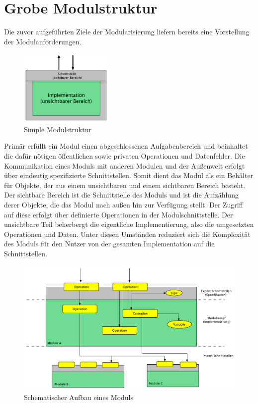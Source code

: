   \section{Grobe Modulstruktur}
      Die zuvor aufgeführten Ziele der Modularisierung liefern bereits eine Vorstellung der Modulanforderungen.
        \begin{figure}[h!] 
        \centering
        \includegraphics[width=0.4\textwidth]{material/images/simple-module.pdf}
        \caption{Simple Modulstruktur \cite{modulMitJava9}}
        \label{fig:simple-module}
      \end{figure}
    Primär erfüllt ein Modul einen abgeschlossenen Aufgabenbereich und beinhaltet die dafür nötigen öffentlichen sowie privaten Operationen und Datenfelder. Die Kommunikation eines Moduls mit anderen Modulen und der Außenwelt erfolgt über eindeutig spezifizierte Schnittstellen.\newline
    Somit dient das Modul als ein Behälter für Objekte, der aus einem unsichtbaren und einem sichtbaren Bereich besteht. Der sichtbare Bereich ist die Schnittstelle des Moduls und ist die Aufzählung derer Objekte, die das Modul nach außen hin zur Verfügung stellt. Der Zugriff auf diese erfolgt über definierte Operationen in der Modulschnittstelle. Der unsichtbare Teil beherbergt die eigentliche Implementierung, also die umgesetzten Operationen und Daten. Unter diesen Umständen reduziert sich die Komplexität des Moduls für den Nutzer von der gesamten Implementation auf die Schnittstellen. \cite{javaMod9,java9modRevealed,explorJava9,modulMitJava9}

      \begin{figure}[h!]
        \centering
        \includegraphics[width=\textwidth]{material/images/Module-workflow.pdf}
        \caption{Schematischer Aufbau eines Moduls \cite{modulMitJava9}}
        \label{fig:mw}
      \end{figure} 

